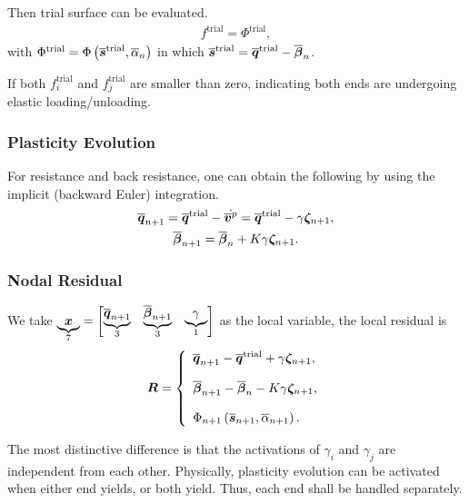 Then trial surface can be evaluated.
\begin{gather}
f^\text{trial}=\Phi^\text{trial},
\end{gather}
with $\Phi^\text{trial}=\Phi\left(\bm{\overline{s}}^\text{trial},\overline{\alpha}_n\right)$ in which $\bm{\overline{s}}^\text{trial}=\bm{\overline{q}}^\text{trial}-\bm{\overline{\beta}}_{n}$.

If both $f^\text{trial}_i$ and $f^\text{trial}_j$ are smaller than zero, indicating both ends are undergoing elastic loading/unloading.
\subsubsection{Plasticity Evolution}
For resistance and back resistance, one can obtain the following by using the implicit (backward Euler) integration.
\begin{gather}\label{eq:nm_qc}
\bm{\overline{q}}_{n+1}=\bm{\overline{q}}^\text{trial}-\dot{\bm{\overline{v}}^p}=\bm{\overline{q}}^\text{trial}-\gamma\bm{\zeta}_{n+1},\\
\bm{\overline{\beta}}_{n+1}=\bm{\overline{\beta}}_{n}+K\gamma{}\bm{\zeta}_{n+1}.
\end{gather}
\subsubsection{Nodal Residual}
We take $\underbrace{\bm{x}}_{7}=\begin{bmatrix}
\underbrace{\bm{\overline{q}}_{n+1}}_{3}&\underbrace{\bm{\overline{\beta}}_{n+1}}_{3}&\underbrace{\gamma}_{1}
\end{bmatrix}$ as the local variable, the local residual is
\begin{gather}\label{eq:nm_nodal_residual}
\bm{R}=\left\{
\begin{array}{l}
\bm{\overline{q}}_{n+1}-\bm{\overline{q}}^\text{trial}+\gamma\bm{\zeta}_{n+1},\\[4mm]
\bm{\overline{\beta}}_{n+1}-\bm{\overline{\beta}}_{n}-K\gamma{}\bm{\zeta}_{n+1},\\[4mm]
\Phi_{n+1}\left(\bm{\overline{s}}_{n+1},\overline{\alpha}_{n+1}\right).
\end{array}
\right.
\end{gather}

The most distinctive difference is that the activations of $\gamma_i$ and $\gamma_j$ are independent from each other. Physically, plasticity evolution can be activated when either end yields, or both yield. Thus, each end shall be handled separately.
